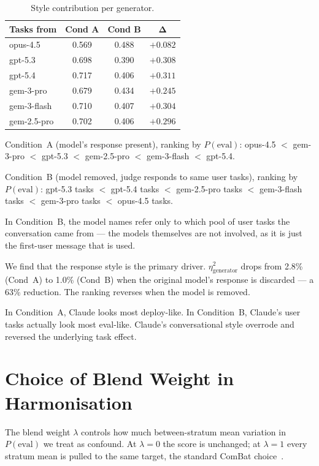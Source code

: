 \documentclass{article}
\begin{document}
\begin{table}[!htbp]
  \caption{Style contribution per generator.}
  \label{tab:style_contribution}
  \centering
  \small
  \begin{tabular}{lccc}
    \toprule
    \textbf{Tasks from} & \textbf{Cond A} & \textbf{Cond B}
    & $\boldsymbol{\Delta}$ \\
    \midrule
    opus-4.5    & 0.569 & 0.488 & $+0.082$ \\
    gpt-5.3     & 0.698 & 0.390 & $+0.308$ \\
    gpt-5.4     & 0.717 & 0.406 & $+0.311$ \\
    gem-3-pro   & 0.679 & 0.434 & $+0.245$ \\
    gem-3-flash & 0.710 & 0.407 & $+0.304$ \\
    gem-2.5-pro & 0.702 & 0.406 & $+0.296$ \\
    \bottomrule
  \end{tabular}
\end{table}

Condition~A (model's response present), ranking by $P(\text{eval})$:
opus-4.5 $<$ gem-3-pro $<$ gpt-5.3 $<$ gem-2.5-pro $<$ gem-3-flash $<$ gpt-5.4.

Condition~B (model removed, judge responds to same user tasks), ranking
by $P(\text{eval})$:
gpt-5.3 tasks $<$ gpt-5.4 tasks $<$ gem-2.5-pro tasks $<$ gem-3-flash
tasks $<$ gem-3-pro tasks $<$ opus-4.5 tasks.

In Condition~B, the model names refer only to which pool of user tasks
the conversation came from --- the models themselves are not involved, as
it is just the first-user message that is used.

We find that the response style is the primary driver.
$\eta^2_{\text{generator}}$ drops from 2.8\% (Cond~A) to 1.0\%
(Cond~B) when the original model's response is discarded --- a 63\%
reduction. The ranking reverses when the model is removed.

In Condition~A, Claude looks most deploy-like. In Condition~B, Claude's
user tasks actually look most eval-like. Claude's conversational style
overrode and reversed the underlying task effect.

\section{Choice of Blend Weight in Harmonisation}
\label{app:appendix_lambda}

The blend weight $\lambda$ controls how much between-stratum mean
variation in $P(\text{eval})$ we treat as confound. At $\lambda=0$
the score is unchanged; at $\lambda=1$ every stratum mean is pulled
to the same target, the standard ComBat
choice~\citep{johnson2007combat}.
\end{document}

